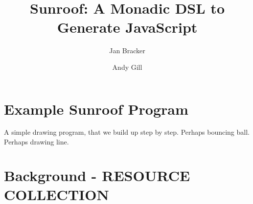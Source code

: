 \documentclass{llncs}
\begin{document}
%
\title{Sunroof: A Monadic DSL to Generate JavaScript}
%
%
\author{Jan Bracker  \and Andy Gill}
%
%
%

\maketitle

\begin{abstract}        

\end{abstract}
%


\section{Example Sunroof Program}
\label{sec:simple-example}

A simple drawing program, that we build up step by step.
Perhaps bouncing ball.
Perhaps drawing line.















\section{Background - RESOURCE COLLECTION}
\label{sec:background}
\end{document}

